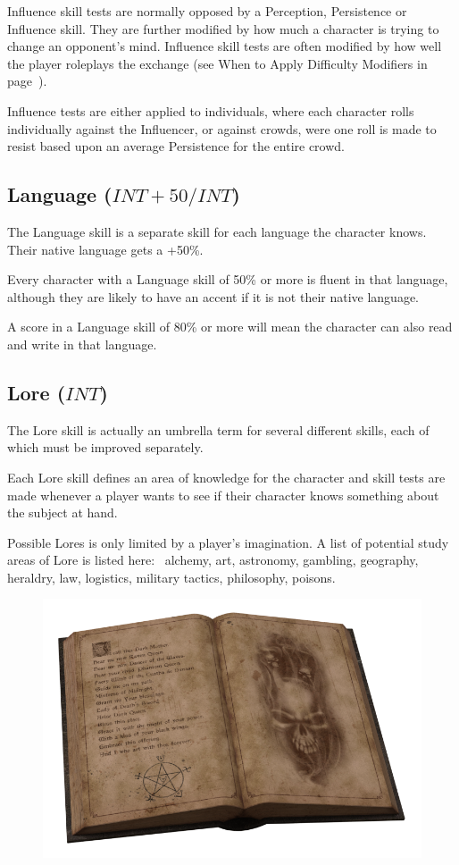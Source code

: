 Influence skill tests are normally opposed by a Perception, Persistence or Influence skill. They are further modified by how much a character is trying to change an opponent’s mind. Influence skill tests are often modified by how well the player roleplays the exchange (see When to Apply Difficulty Modifiers in page~\pageref{ssec:when-to-apply-difficulty-modifies}).

Influence tests are either applied to individuals, where each character rolls individually against the Influencer, or against crowds, were one roll is made to resist based upon an average Persistence for the entire crowd.


\subsection{Language ($INT+50/INT$)}
The Language skill is a separate skill for each language the character knows. Their native language gets a +50\%.

Every character with a Language skill of 50\% or more is fluent in that language, although they are likely to have an accent if it is not their native language. 

A score in a Language skill of 80\% or more will mean the character can also read and write in that language.


\subsection{Lore ($INT$)}
The Lore skill is actually an umbrella term for several different skills, each of which must be improved separately. 

Each Lore skill defines an area of knowledge for the character and skill tests are made whenever a player wants to see if their character knows something about the subject at hand. 

Possible Lores is only limited by a player’s imagination. A list of potential study areas of Lore is listed here:  alchemy, art, astronomy, gambling, geography, heraldry, law, logistics, military tactics, philosophy, poisons.

\begin{figure}[h]
\begin{center}
\includegraphics[scale=0.2]{img/OpenBook.png}
\end{center}
\end{figure}


